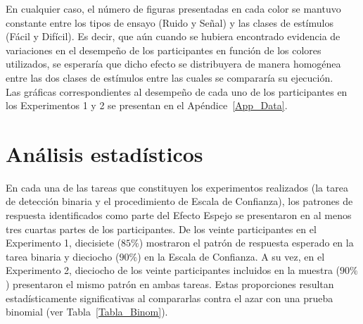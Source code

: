 En cualquier caso, el número de figuras presentadas en cada color se mantuvo constante entre los tipos de ensayo (Ruido y Señal) y las clases de estímulos (Fácil y Difícil). Es decir, que aún cuando se hubiera encontrado evidencia de variaciones en el desempeño de los participantes en función de los colores utilizados, se esperaría que dicho efecto se distribuyera de manera homogénea entre las dos clases de estímulos entre las cuales se compararía su ejecución.\\

Las gráficas correspondientes al desempeño de cada uno de los participantes en los Experimentos 1 y 2 se presentan en el Apéndice~\ref{App_Data}.\\




































\section{Análisis estadísticos}

En cada una de las tareas que constituyen los experimentos realizados (la tarea de detección binaria y el procedimiento de Escala de Confianza), los patrones de respuesta identificados como parte del Efecto Espejo se presentaron en al menos tres cuartas partes de los participantes. De los veinte participantes en el Experimento 1, diecisiete ($85\%$) mostraron el patrón de respuesta esperado en la tarea binaria y dieciocho ($90\%$) en la Escala de Confianza. A su vez, en el Experimento 2, dieciocho de los veinte participantes incluidos en la muestra ($90\%$) presentaron el mismo patrón en ambas tareas. Estas proporciones resultan estadísticamente significativas al compararlas contra el azar con una prueba binomial (ver Tabla~\ref{Tabla_Binom}).\\


